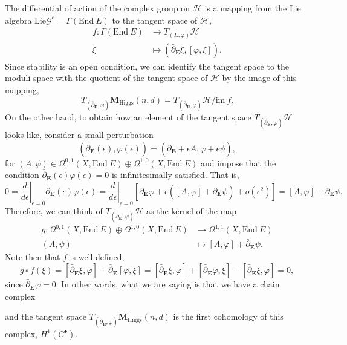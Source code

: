 \documentclass[12pt,a4paper]{book}
\theoremstyle{definition} \newtheorem{defn}[thm]{Definition}
\theoremstyle{definition} \newtheorem{ejemplo}[thm]{Example}
\theoremstyle{remark} \newtheorem{rem}[thm]{Remark}
\def\HH{\mathscr{H}}
\def\GG{\mathscr{G}}
\def\im{\mathrm{im}\ }
\def\Lie{\mathrm{Lie}}
\def\End{\mathrm{End}}
\def\Hig{\mathbf{M}_{\mathrm{Higgs}}}
\def\delbar{\bar{\partial}}
\newcommand{\ve}[1]{\mathbf{#1}}
\begin{document}
	    The differential of action of the complex group on $\HH$ is a mapping from the Lie algebra $\Lie \GG^c= \Gamma(\End\ E)$ to the tangent space of $\HH$,
	    \begin{align*}
	      f:\Gamma(\End\ E)&\longrightarrow T_{(E,\varphi)}\HH\\ 
	      \xi &\longmapsto (\delbar_{\ve{E}} \xi, [\varphi,\xi]). 
	      \end{align*}
	      Since stability is an open condition, we can identify the tangent space to the moduli space with the quotient of the tangent space of $\HH$ by the image of this mapping, $$T_{(\delbar_{\ve{E}},\varphi)}\Hig(n,d)=T_{(\delbar_{\ve{E}},\varphi)}\HH/\im f.$$ On the other hand, to obtain how an element of the tangent space $T_{(\delbar_{\ve{E}},\varphi)}\HH$ looks like, consider a small perturbation $$(\delbar_{\ve{E}}(\epsilon), \varphi(\epsilon))=(\delbar_{\ve{E}}+\epsilon A, \varphi + \epsilon \psi),$$ for $(A,\psi) \in \Omega^{0,1}(X,\End \ E) \oplus \Omega^{1,0}(X, \End \ E)$ and impose that the condition $\delbar_{\ve{E}}(\epsilon)\varphi(\epsilon)=0$ is infinitesimally satisfied. That is,
	    \begin{equation*}
	      0=\left.\frac{d}{d\epsilon} \right|_{\epsilon=0} \delbar_{\ve{E}}(\epsilon)\varphi(\epsilon)=\left.\frac{d}{d\epsilon} \right|_{\epsilon=0}\left[ \delbar_{\ve{E}} \varphi + \epsilon\left( [A,\varphi]+\delbar_{\ve{E}}\psi \right)+ o(\epsilon^2) \right] = [A,\varphi]+\delbar_{\ve{E}}\psi.
	    \end{equation*}
	    Therefore, we can think of $T_{(\delbar_{\ve{E}},\varphi)}\HH$ as the kernel of the map
	    \begin{align*}
	      g :\Omega^{0,1}(X,\End \ E) \oplus \Omega^{1,0}(X, \End \ E)&\longrightarrow \Omega^{1,1}(X, \End\ E)\\ 
	      (A,\psi) &\longmapsto [A,\varphi]+\delbar_{\ve{E}}\psi. 
	      \end{align*}
	      Note then that $f$ is well defined,
	      \begin{equation*}
		g\circ f(\xi)=[\delbar_{\ve{E}}\xi,\varphi]+\delbar_{\ve{E}}[\varphi,\xi]=[\delbar_{\ve{E}}\xi,\varphi]+[\delbar_{\ve{E}}\varphi,\xi]-[\delbar_{\ve{E}}\xi,\varphi]=0,
	      \end{equation*}
	      since $\delbar_{\ve{E}}\varphi=0$. In other words, what we are saying is that we have a chain complex
	      \begin{center}
	      \end{center}
	      and the tangent space $T_{(\delbar_{\ve{E}},\varphi)}\Hig(n,d)$ is the first cohomology of this complex, $H^1(C^\bullet)$.
\end{document}
